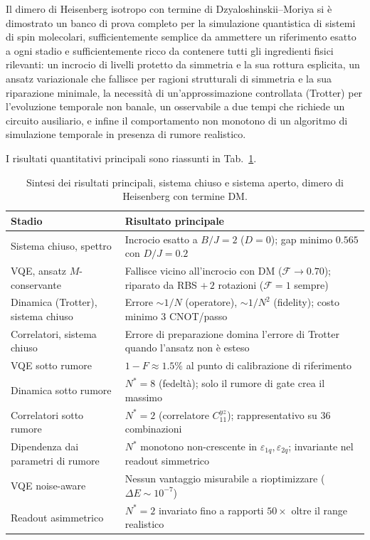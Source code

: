 \documentclass[11pt,a4paper]{article}
\begin{document}
Il dimero di Heisenberg isotropo con termine di Dzyaloshinskii--Moriya si
è dimostrato un banco di prova completo per la simulazione quantistica di
sistemi di spin molecolari, sufficientemente semplice da ammettere un
riferimento esatto a ogni stadio e sufficientemente ricco da contenere
tutti gli ingredienti fisici rilevanti: un incrocio di livelli protetto da
simmetria e la sua rottura esplicita, un ansatz variazionale che fallisce
per ragioni strutturali di simmetria e la sua riparazione minimale, la
necessità di un'approssimazione controllata (Trotter) per l'evoluzione
temporale non banale, un osservabile a due tempi che richiede un circuito
ausiliario, e infine il comportamento non monotono di un algoritmo di
simulazione temporale in presenza di rumore realistico.

I risultati quantitativi principali sono riassunti in Tab.~\ref{tab:sintesi}.

\begin{table}[htbp]
\centering
\renewcommand{\arraystretch}{1.35}
\small
\begin{tabular}{@{}p{4.6cm}p{10.5cm}@{}}
\toprule
Stadio & Risultato principale \\
\midrule
Sistema chiuso, spettro & Incrocio esatto a $B/J=2$ ($D=0$); gap minimo $0.565$ con $D/J=0.2$ \\
VQE, ansatz $M$-conservante & Fallisce vicino all'incrocio con DM ($\mathcal F\to0.70$); riparato da RBS $+\,2$ rotazioni ($\mathcal F=1$ sempre) \\
Dinamica (Trotter), sistema chiuso & Errore $\sim1/N$ (operatore), $\sim1/N^2$ (fidelity); costo minimo $3$ CNOT/passo \\
Correlatori, sistema chiuso & Errore di preparazione domina l'errore di Trotter quando l'ansatz non è esteso \\
VQE sotto rumore & $1-F\approx1.5\%$ al punto di calibrazione di riferimento \\
Dinamica sotto rumore & $N^*=8$ (fedeltà); solo il rumore di gate crea il massimo \\
Correlatori sotto rumore & $N^*=2$ (correlatore $C_{11}^{yz}$); rappresentativo su 36 combinazioni \\
Dipendenza dai parametri di rumore & $N^*$ monotono non-crescente in $\varepsilon_{1q},\varepsilon_{2q}$; invariante nel readout simmetrico \\
VQE noise-aware & Nessun vantaggio misurabile a rioptimizzare ($\Delta E\sim10^{-7}$) \\
Readout asimmetrico & $N^*=2$ invariato fino a rapporti $50\times$ oltre il range realistico \\
\bottomrule
\end{tabular}
\caption{Sintesi dei risultati principali, sistema chiuso e sistema
aperto, dimero di Heisenberg con termine DM.}
\label{tab:sintesi}
\end{table}
\end{document}
